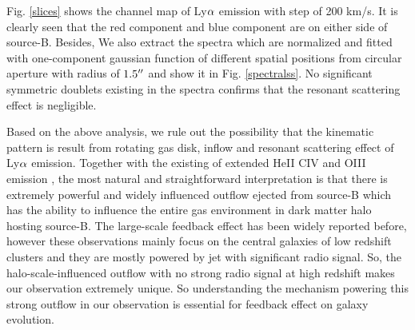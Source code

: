 Fig. \ref{slices} shows the channel map of Ly$\rm \alpha$ emission with step of 200 km/s. It is clearly seen that the red component and blue component are on either side of source-B. Besides, We also extract the spectra which are normalized and fitted with one-component gaussian function of different spatial positions from circular aperture with radius of $\rm 1.5 \mbox{$^{\prime\prime}$}$ and show it in Fig. \ref{spectralss}. No significant symmetric doublets existing in the spectra confirms that the resonant scattering effect is negligible. 

Based on the above analysis, we rule out the possibility that the kinematic pattern is result from rotating gas disk, inflow and resonant scattering effect of Ly$\rm \alpha$ emission. Together with the existing of extended HeII CIV and OIII emission \citep{cai2017discovery}, the most natural and straightforward interpretation is that there is extremely powerful and widely influenced outflow ejected from source-B which has the ability to influence the entire gas environment in dark matter halo hosting source-B. The large-scale feedback effect has been widely reported before, however these observations mainly focus on the central galaxies of low redshift clusters and they are mostly powered by jet with significant radio signal. So, the halo-scale-influenced outflow with no strong radio signal at high redshift makes our observation extremely unique. So understanding the mechanism powering this strong outflow in our observation is essential for feedback effect on galaxy evolution.  

